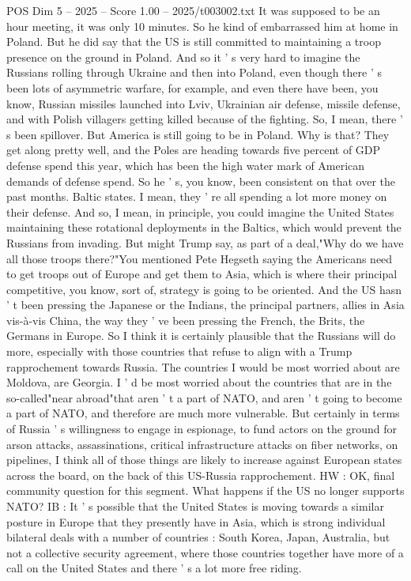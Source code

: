 \begin{textsample}{POS Dim 5 – 2025 – Score 1.00 – 2025/t003002.txt}
It was supposed to be an hour meeting, it was only 10 minutes.
So he kind of embarrassed him at home in Poland.
But he did say that the US is still committed to maintaining a troop presence on the ground in Poland.
And so it ' s very hard to imagine the Russians rolling through Ukraine and then into Poland, even though there ' s been lots of asymmetric warfare, for example, and even there have been, you know, Russian missiles launched into Lviv, Ukrainian air defense, missile defense, and with Polish villagers getting killed because of the fighting.
So, I mean, there ' s been spillover.
But America is still going to be in Poland.
Why is that?
They get along pretty well, and the Poles are heading towards five percent of GDP defense spend this year, which has been the high water mark of American demands of defense spend.
So he ' s, you know, been consistent on that over the past months.
Baltic states.
I mean, they ' re all spending a lot more money on their defense.
And so, I mean, in principle, you could imagine the United States maintaining these rotational deployments in the Baltics, which would prevent the Russians from invading.
But might Trump say, as part of a deal,"Why do we have all those troops there?"You mentioned Pete Hegseth saying the Americans need to get troops out of Europe and get them to Asia, which is where their principal competitive, you know, sort of, strategy is going to be oriented.
And the US hasn ' t been pressing the Japanese or the Indians, the principal partners, allies in Asia vis-à-vis China, the way they ' ve been pressing the French, the Brits, the Germans in Europe.
So I think it is certainly plausible that the Russians will do more, especially with those countries that refuse to align with a Trump rapprochement towards Russia.
The countries I would be most worried about are Moldova, are Georgia.
I ' d be most worried about the countries that are in the so-called"near abroad"that aren ' t a part of NATO, and aren ' t going to become a part of NATO, and therefore are much more vulnerable.
But certainly in terms of Russia ' s willingness to engage in espionage, to fund actors on the ground for arson attacks, assassinations, critical infrastructure attacks on fiber networks, on pipelines, I think all of those things are likely to increase against European states across the board, on the back of this US-Russia rapprochement.
HW : OK, final community question for this segment.
What happens if the US no longer supports NATO?
IB : It ' s possible that the United States is moving towards a similar posture in Europe that they presently have in Asia, which is strong individual bilateral deals with a number of countries : South Korea, Japan, Australia, but not a collective security agreement, where those countries together have more of a call on the United States and there ' s a lot more free riding.

\end{textsample}
